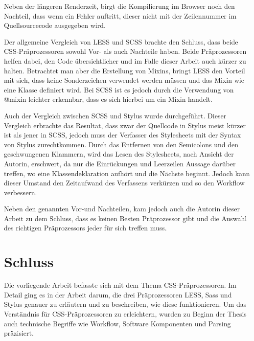 Neben der längeren Renderzeit, birgt die Kompilierung im Browser noch den Nachteil, dass wenn ein Fehler auftritt, dieser nicht mit der Zeilennummer im Quellsourcecode ausgegeben wird. 

Der allgemeine Vergleich von LESS und SCSS brachte den Schluss, dass beide CSS-Präprozessoren sowohl Vor- als auch Nachteile haben. Beide Präprozessoren helfen dabei, den Code übersichtlicher und im Falle dieser Arbeit auch kürzer zu halten.\newline
Betrachtet man aber die Erstellung von Mixins, bringt LESS den Vorteil mit sich, dass keine Sonderzeichen verwendet werden müssen und das Mixin wie eine Klasse definiert wird. Bei SCSS ist es jedoch durch die Verwendung von \glqq{}@mixin\grqq{} leichter erkennbar, dass es sich hierbei um ein Mixin handelt.

Auch der Vergleich zwischen SCSS und Stylus wurde durchgeführt. Dieser Vergleich erbrachte das Resultat, dass zwar der Quellcode in Stylus meist kürzer ist als jener in SCSS, jedoch muss der Verfasser des Stylesheets mit der Syntax von Stylus zurechtkommen.\newline
Durch das Entfernen von den Semicolons und den geschwungenen Klammern, wird das Lesen des Stylesheets, nach Ansicht der Autorin, erschwert, da nur die Einrückungen und Leerzeilen Aussage darüber treffen, wo eine Klassendeklaration aufhört und die Nächste beginnt. \newline
Jedoch kann dieser Umstand den Zeitaufwand des Verfassens verkürzen und so den Workflow verbessern.

Neben den genannten Vor-und Nachteilen, kam jedoch auch die Autorin dieser Arbeit zu dem Schluss, dass es keinen \glqq{}Besten\grqq{} Präprozessor gibt und die Auswahl des richtigen Präprozessors jeder für sich treffen muss.
\section{Schluss}
Die vorliegende Arbeit befasste sich mit dem Thema \glqq{}CSS-Präprozessoren\grqq{}. Im Detail ging es in der Arbeit darum, die drei Präprozessoren \glqq{}LESS\grqq{}, \glqq{}Sass\grqq{} und \glqq{}Stylus\grqq{} genauer zu erläutern und zu beschreiben, wie diese funktionieren.\newline
Um das Verständnis für CSS-Präprozessoren zu erleichtern, wurden zu Beginn der Thesis auch technische Begriffe wie \glqq{}Workflow\grqq{}, \glqq{}Software Komponenten\grqq{} und \glqq{}Parsing\grqq{} präzisiert.

